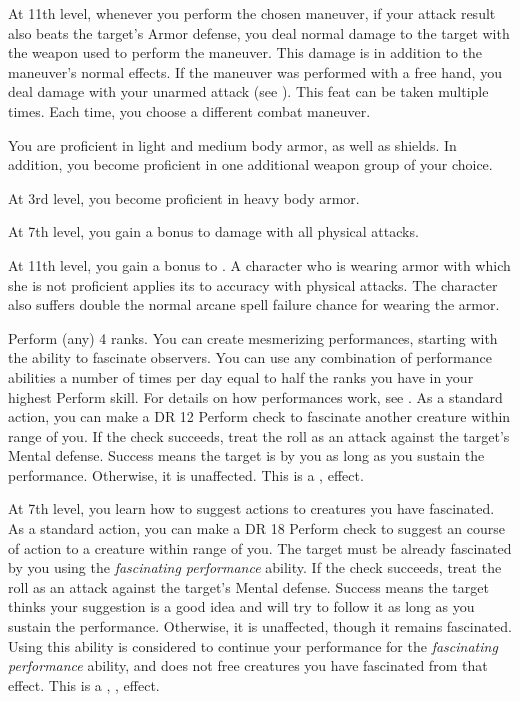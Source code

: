     At 11th level, whenever you perform the chosen maneuver, if your attack result also beats the target's Armor defense, you deal normal damage to the target with the weapon used to perform the maneuver.
    This damage is in addition to the maneuver's normal effects.
    If the maneuver was performed with a free hand, you deal damage with your unarmed attack (see ).
     This feat can be taken multiple times.
    Each time, you choose a different combat maneuver.

    \featben You are proficient in light and medium body armor, as well as shields.
    In addition, you become proficient in one additional weapon group of your choice.

    At 3rd level, you become proficient in heavy body armor.

    At 7th level, you gain a  bonus to damage with all physical attacks.

    At 11th level, you gain a  bonus to .
    A character who is wearing armor with which she is not proficient applies its  to accuracy with physical attacks.
    The character also suffers double the normal arcane spell failure chance for wearing the armor.

    \featpre Perform (any) 4 ranks.
    \featben You can create mesmerizing performances, starting with the ability to fascinate observers.
    You can use any combination of performance abilities a number of times per day equal to half the ranks you have in your highest Perform skill.
    For details on how performances work, see .
    \featben As a standard action, you can make a DR 12 Perform check to fascinate another creature within \rngmed range of you.
    If the check succeeds, treat the roll as an attack against the target's Mental defense.
    Success means the target is \fascinated by you as long as you sustain the performance.
    Otherwise, it is unaffected.
    This is a ,  effect.

    At 7th level, you learn how to suggest actions to creatures you have fascinated.
    As a standard action, you can make a DR 18 Perform check to suggest an course of action to a creature within \rngmed range of you.
    The target must be already fascinated by you using the \textit{fascinating performance} ability.
    If the check succeeds, treat the roll as an attack against the target's Mental defense.
    Success means the target thinks your suggestion is a good idea and will try to follow it as long as you sustain the performance.
    Otherwise, it is unaffected, though it remains fascinated.
    Using this ability is considered to continue your performance for the \textit{fascinating performance} ability, and does not free creatures you have fascinated from that effect.
    This is a , ,  effect.

